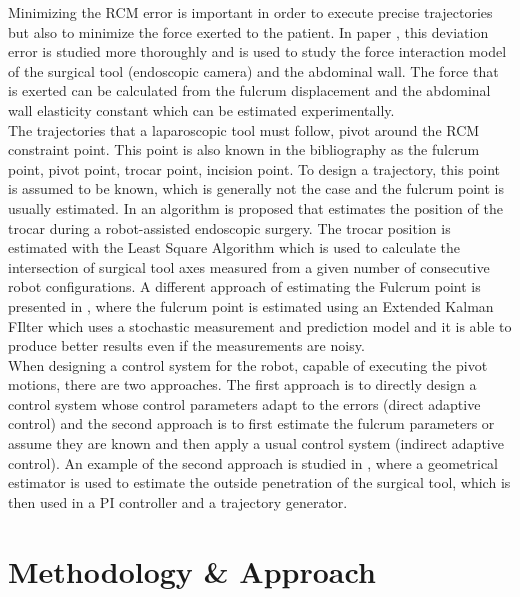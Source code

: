 Minimizing the RCM error is important in order to execute precise trajectories but also to minimize the force exerted to the patient. In paper \cite{4957177}, this deviation error is studied more thoroughly and is used to study the 
force interaction model of the surgical tool (endoscopic camera) and the abdominal wall. The force that is exerted can be calculated from the fulcrum displacement and the abdominal wall elasticity constant which can be 
estimated experimentally.\\

The trajectories that a laparoscopic tool must follow, pivot around the RCM constraint point. This point is also known in the bibliography as the fulcrum point, pivot point, trocar point, incision point. To design a 
trajectory, this point is assumed to be known, which is generally not the case and the fulcrum point is usually estimated. In \cite{Dong2016RobustTD} an algorithm is proposed that estimates the position of the trocar during a robot-assisted 
endoscopic surgery. The trocar position is estimated with the Least Square Algorithm which is used to calculate the intersection of surgical tool axes measured from a given number of consecutive robot configurations. A 
different approach of estimating the Fulcrum point is presented in \cite{Gruijthuijsen2018LeveragingTF}, where the fulcrum point is estimated using an Extended Kalman FIlter which uses a stochastic measurement and prediction model and it is able to produce 
better results even if the measurements are noisy.\\

When designing a control system for the robot, capable of executing the pivot motions, there are two approaches. The first approach is to directly design a control system whose control parameters adapt to the errors (direct 
adaptive control) and the second approach is to first estimate the fulcrum parameters or assume they are known and then apply a usual control system (indirect adaptive control). An example of the second approach is studied in 
\cite{Muoz2005PivotingMC}, where a geometrical estimator is used to estimate the outside penetration of the surgical tool, which is then used in a PI controller and a trajectory generator.\\




\section{Methodology \& Approach}


